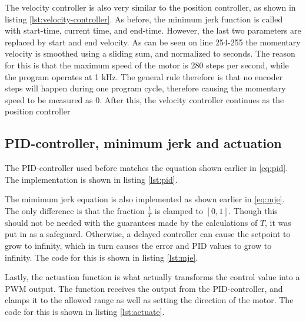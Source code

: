 \documentclass[11pt]{article}
\begin{document}


The velocity controller is also very similar to the position controller, as shown in listing \vref{lst:velocity-controller}. As before, the minimum jerk function is called with start-time, current time, and end-time. However, the last two parameters are replaced by  start and end velocity. As can be seen on line 254-255 the momentary velocity is smoothed using a sliding sum, and normalized to seconds. The reason for this is that the maximum speed of the motor is 280 steps per second, while the program operates at 1 kHz. The general rule therefore is that no encoder steps will happen during one program cycle, therefore causing the momentary speed to be measured as 0. After this, the velocity controller continues as the position controller




\subsection{PID-controller, minimum jerk and actuation}
The PID-controller used before matches the equation shown earlier in \vref{eq:pid}. The implementation is shown in listing \vref{lst:pid}.



The mimimum jerk equation is also implemented as shown earlier  in \vref{eq:mje}. The only difference is that the fraction $\frac{t}{T}$ is clamped to $[0,1]$. Though this should not be needed with the guarantees made by the calculations of $T$, it was put in as a safeguard. Otherwise, a delayed controller can cause the setpoint to grow to infinity, which in turn causes the error and PID values to grow to infinity. The code for this is shown in listing \vref{lst:mje}.\par



Lastly, the actuation function is what actually transforms the control value into a PWM output. The function receives the output from the PID-controller, and clamps it to the allowed range as well as setting the direction of the motor. The code for this is shown in listing \vref{lst:actuate}.
\end{document}
